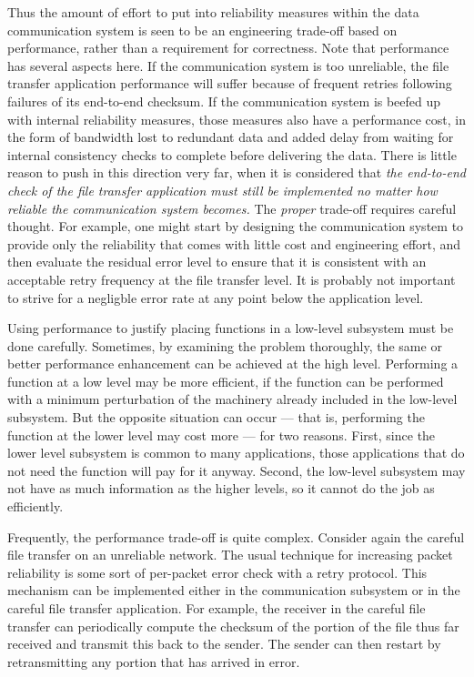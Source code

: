 \documentclass[a4paper,11pt,notitlepage,twoside,openright]{article}
\begin{document}
Thus the amount of effort to put into reliability measures within the
data communication system is seen to be an engineering trade-off based
on performance, rather than a requirement for correctness. Note that
performance has several aspects here. If the communication system is too
unreliable, the file transfer application performance will suffer
because of frequent retries following failures of its end-to-end
checksum. If the communication system is beefed up with internal
reliability measures, those measures also have a performance cost, in
the form of bandwidth lost to redundant data and added delay from
waiting for internal consistency checks to complete before delivering
the data. There is little reason to push in this direction very far,
when it is considered that \emph{the end-to-end check of the file
transfer application must still be implemented no matter how reliable
the communication system becomes.} The \emph{proper} trade-off requires
careful thought. For example, one might start by designing the
communication system to provide only the reliability that comes with
little cost and engineering effort, and then evaluate the residual error
level to ensure that it is consistent with an acceptable retry frequency
at the file transfer level. It is probably not important to strive for a
negligble error rate at any point below the application level.


Using performance to justify placing functions in a low-level subsystem
must be done carefully. Sometimes, by examining the problem thoroughly,
the same or better performance enhancement can be achieved at the high
level. Performing a function at a low level may be more efficient, if
the function can be performed with a minimum perturbation of the
machinery already included in the low-level subsystem. But the opposite
situation can occur --- that is, performing the function at the lower
level may cost more --- for two reasons. First, since the lower level
subsystem is common to many applications, those applications that do not
need the function will pay for it anyway. Second, the low-level
subsystem may not have as much information as the higher levels, so it
cannot do the job as efficiently.

Frequently, the performance trade-off is quite complex. Consider again
the careful file transfer on an unreliable network. The usual technique
for increasing packet reliability is some sort of per-packet error check
with a retry protocol. This mechanism can be implemented either in the
communication subsystem or in the careful file transfer application. For
example, the receiver in the careful file transfer can periodically
compute the checksum of the portion of the file thus far received and
transmit this back to the sender. The sender can then restart by
retransmitting any portion that has arrived in error.
\end{document}
